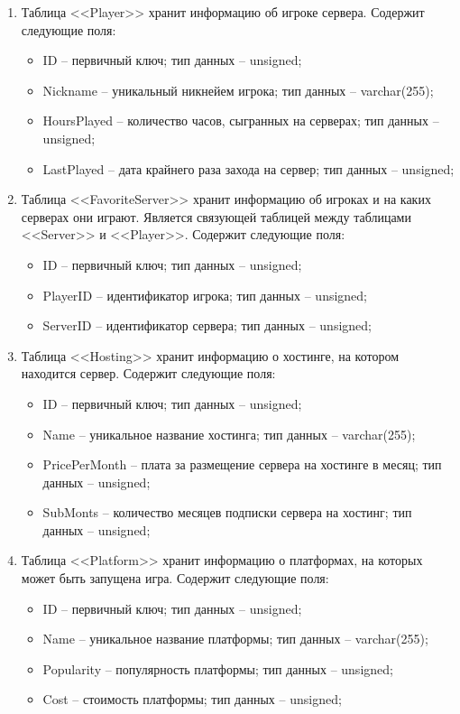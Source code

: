 \begin{enumerate}
        \item Таблица <<Player>> хранит информацию об игроке сервера. Содержит следующие поля:
        \begin{itemize}
            \item ID -- первичный ключ; тип данных -- unsigned;
            \item Nickname -- уникальный никнейем игрока; тип данных -- varchar(255);
            \item HoursPlayed -- количество часов, сыгранных на серверах; тип данных -- unsigned;
            \item LastPlayed -- дата крайнего раза захода на сервер; тип данных -- unsigned;
        \end{itemize}

        \item Таблица <<FavoriteServer>> хранит информацию об игроках и на каких серверах они играют. Является связующей таблицей между таблицами <<Server>> и <<Player>>. Содержит следующие поля:
        \begin{itemize}
            \item ID -- первичный ключ; тип данных -- unsigned;
            \item PlayerID -- идентификатор игрока; тип данных -- unsigned;
            \item ServerID -- идентификатор сервера; тип данных -- unsigned;
        \end{itemize}

        \item Таблица <<Hosting>> хранит информацию о хостинге, на котором находится сервер. Содержит следующие поля:
        \begin{itemize}
            \item ID -- первичный ключ; тип данных -- unsigned;
            \item Name -- уникальное название хостинга; тип данных -- varchar(255);
            \item PricePerMonth -- плата за размещение сервера на хостинге в месяц; тип данных -- unsigned;
            \item SubMonts -- количество месяцев подписки сервера на хостинг; тип данных -- unsigned;
        \end{itemize}

        \item Таблица <<Platform>> хранит информацию о платформах, на которых может быть запущена игра. Содержит следующие поля:
        \begin{itemize}
            \item ID -- первичный ключ; тип данных -- unsigned;
            \item Name -- уникальное название платформы; тип данных -- varchar(255);
            \item Popularity -- популярность платформы; тип данных -- unsigned;
            \item Cost -- стоимость платформы; тип данных -- unsigned;
        \end{itemize}
\end{enumerate}


